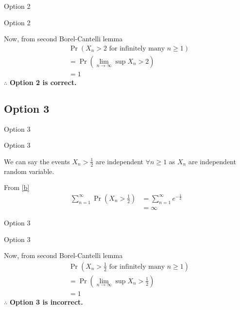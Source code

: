 \documentclass{beamer}
\providecommand{\pr}[1]{\ensuremath{\Pr\left(#1\right)}}
\providecommand{\pr}[1]{\ensuremath{\Pr\left(#1\right)}}
\theoremstyle{remark}
\numberwithin{equation}{subsection}
\begin{document}
\begin{frame}{Option 2}
\begin{block}{Option 2}

    Now, from second Borel-Cantelli lemma
    \begin{align}
        &\pr{X_n>2 \text{ for infinitely many }n\geq1}\nonumber\\
        &=\pr{\lim_{n \rightarrow \infty}\sup X_n>2}\nonumber\\
        &=1\nonumber
    \end{align}
    $\therefore$ \textbf{Option 2 is correct.}

\end{block}
\end{frame}


\subsection{Option 3}
\begin{frame}{Option 3}
\begin{block}{Option 3}

We can say the events $X_n>\frac{1}{2}$ are independent $\forall n\geq 1$ as $X_n$ are independent random variable.
    
    From \eqref{b}
    \begin{align}
        \sum_{n=1}^{\infty}\pr{X_n > \frac{1}{2}} &= \sum_{n=1}^{\infty}e^{-\frac{1}{2}}\nonumber\\
                                            &= \infty\nonumber
    \end{align}
    
\end{block}
\end{frame}

\begin{frame}{Option 3}
\begin{block}{Option 3}

    Now, from second Borel-Cantelli lemma
    \begin{align}
        &\pr{X_n>\frac{1}{2} \text{ for infinitely many }n\geq1}\nonumber\\
        &=\pr{\lim_{n \rightarrow \infty}\sup X_n>\frac{1}{2}}\nonumber\\
        &=1\nonumber
    \end{align}
    $\therefore$ \textbf{Option 3 is incorrect.}

\end{block}
\end{frame}
\end{document}
